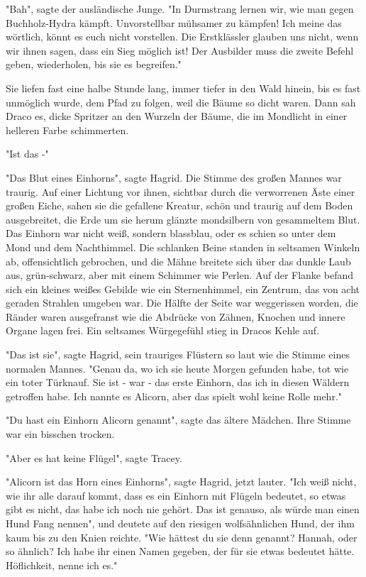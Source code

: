 {"Bah", sagte der ausländische Junge. "In Durmstrang lernen wir, wie man gegen Buchholz-Hydra kämpft. Unvorstellbar mühsamer zu kämpfen! Ich meine das wörtlich, könnt es euch nicht vorstellen. Die Erstklässler glauben uns nicht, wenn wir ihnen sagen, dass ein Sieg möglich ist! Der Ausbilder muss die zweite Befehl geben, wiederholen, bis sie es begreifen."

Sie liefen fast eine halbe Stunde lang, immer tiefer in den Wald hinein, bis es fast unmöglich wurde, dem Pfad zu folgen, weil die Bäume so dicht waren. Dann sah Draco es, dicke Spritzer an den Wurzeln der Bäume, die im Mondlicht in einer helleren Farbe schimmerten.

"Ist das -"

"Das Blut eines Einhorns", sagte Hagrid. Die Stimme des großen Mannes war traurig. Auf einer Lichtung vor ihnen, sichtbar durch die verworrenen Äste einer großen Eiche, sahen sie die gefallene Kreatur, schön und traurig auf dem Boden ausgebreitet, die Erde um sie herum glänzte mondsilbern von gesammeltem Blut. Das Einhorn war nicht weiß, sondern blassblau, oder es schien so unter dem Mond und dem Nachthimmel. Die schlanken Beine standen in seltsamen Winkeln ab, offensichtlich gebrochen, und die Mähne breitete sich über das dunkle Laub aus, grün-schwarz, aber mit einem Schimmer wie Perlen. Auf der Flanke befand sich ein kleines weißes Gebilde wie ein Sternenhimmel, ein Zentrum, das von acht geraden Strahlen umgeben war. Die Hälfte der Seite war weggerissen worden, die Ränder waren ausgefranst wie die Abdrücke von Zähnen, Knochen und innere Organe lagen frei. Ein seltsames Würgegefühl stieg in Dracos Kehle auf.

"Das ist sie", sagte Hagrid, sein trauriges Flüstern so laut wie die Stimme eines normalen Mannes. "Genau da, wo ich sie heute Morgen gefunden habe, tot wie ein toter Türknauf. Sie ist - war - das erste Einhorn, das ich in diesen Wäldern getroffen habe. Ich nannte es Alicorn, aber das spielt wohl keine Rolle mehr."

"Du hast ein Einhorn Alicorn genannt", sagte das ältere Mädchen. Ihre Stimme war ein bisschen trocken.

"Aber es hat keine Flügel", sagte Tracey.

"Alicorn ist das Horn eines Einhorns", sagte Hagrid, jetzt lauter. "Ich weiß nicht, wie ihr alle darauf kommt, dass es ein Einhorn mit Flügeln bedeutet, so etwas gibt es nicht, das habe ich noch nie gehört. Das ist genauso, als würde man einen Hund Fang nennen", und deutete auf den riesigen wolfsähnlichen Hund, der ihm kaum bis zu den Knien reichte. "Wie hättest du sie denn genannt? Hannah, oder so ähnlich? Ich habe ihr einen Namen gegeben, der für sie etwas bedeutet hätte. Höflichkeit, nenne ich es."

}
